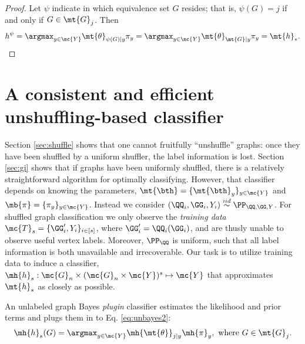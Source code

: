 \documentclass[10pt,journal,cspaper,compsoc]{IEEEtran}
\begin{document}
\begin{proof}
Let $\psi$ indicate in which equivalence set $G$ resides; that is,  $\psi(G)=j$ if and only if $G \in \mt{G}_j$.  Then
\begin{align}
	h^{\psi}= \argmax_{y \in \mc{Y}} \mt{\theta}_{\psi(G)|y} \pi_y = \argmax_{y \in \mc{Y}} \mt{\theta}_{\mt{G}|y} \pi_y = \mt{h}_*.
\end{align}
\end{proof}



\section{A consistent and efficient unshuffling-based classifier} %
\label{sec:bayes_optimal_graph_invariant_based_classifier}


Section \ref{sec:shuffle} shows that one cannot fruitfully ``unshuffle'' graphs: once they have been shuffled by a uniform shuffler, the label information is lost.  Section \ref{sec:gi} shows that if graphs have been uniformly shuffled, there is a relatively straightforward algorithm for optimally classifying. However, that classifier depends on knowing the parameters, $\mt{\bth}=\{\mt{\bth}_y\}_{y\in \mc{Y}}$ and $\mb{\pi}=\{\pi_y\}_{y \in \mc{Y}}$. Instead we consider  $(\QQ_i,\GG_i,Y_i)\overset{iid}{\sim}\PP_{\QQ,\GG,Y}$.  For shuffled graph classification we only observe the \emph{training data} $\mc{T}_s=\{\GG_i',Y_i\}_{i \in [s]}$, where $\GG_i'=\QQ_i(\GG_i)$, and are thusly unable to observe useful vertex labels.  Moreover, $\PP_{\QQ}$ is uniform, such that all label information is both unavailable and irrecoverable.  Our task is to utilize training data to induce a classifier, $\mh{h}_s: \mc{G}_n \times (\mc{G}_n \times \mc{Y})^s \mapsto \mc{Y}$ that approximates $\mt{h}_*$ as closely as possible.  

An unlabeled graph Bayes \emph{plugin} classifier estimates the likelihood and prior terms and plugs them in to Eq. \eqref{eq:unbayes2}:
\begin{align} \label{eq:class}
	\mh{h}_s(G)=\argmax_{y\in\mc{Y}} \mh{\mt{\theta}}_{j|y}\mh{\pi}_y, \text{ where } G\in \mt{G}_j.
\end{align}
\end{document}
